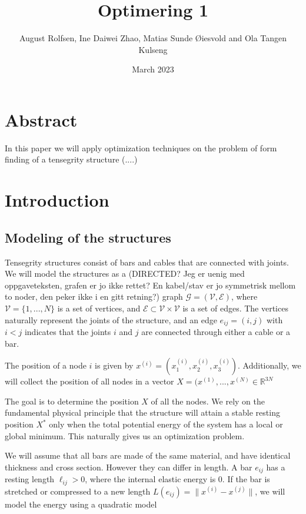 \documentclass[11pt]{article}
\title{\vspace{-2em} Optimering 1\vspace{-1em}}
\author{August Rolfsen, Ine Daiwei Zhao, Matias Sunde Øiesvold and Ola Tangen Kulseng}
\date{\vspace{-1em}March 2023\vspace{-2em}}
\begin{document}
\maketitle
\section{Abstract}

In this paper we will apply optimization techniques on the problem of form finding of a tensegrity structure (....)

\section{Introduction}
\subsection{Modeling of the structures}
Tensegrity structures consist of bars and cables that are connected with joints. We will model the structures as a (DIRECTED? Jeg er uenig med oppgaveteksten, grafen er jo ikke rettet? En kabel/stav er jo symmetrisk mellom to noder, den peker ikke i en gitt retning?) graph $\mathcal{G} = (\mathcal{V},\mathcal{E})$, where $\mathcal{V} = \{1,...,N\}$ is a set of vertices, and $\mathcal{E} \subset \mathcal{V} \times \mathcal{V}$ is a set of edges. The vertices naturally represent the joints of the structure, and an edge $e_{ij} = (i,j)$ with $i < j$ indicates that the joints $i$ and $j$ are connected through either a cable or a bar.

The position of a node $i$ is given by $x^{(i)} = (x_1^{(i)},x_2^{(i)},x_3^{(i)})$. Additionally, we will collect the position of all nodes in a vector $X = (x^{(1)},...,x^{(N)} \in \mathbb{R}^{3N}$

The goal is to determine the position $X$ of all the nodes. We rely on the fundamental physical principle that the structure will attain a stable resting position $X^*$ only when the total potential energy of the system has a local or global minimum. This naturally gives us an optimization problem.

We will assume that all bars are made of the same material, and have identical thickness and cross section. However they can differ in length. A bar $e_{ij}$ has a resting length $\ell_{ij}>0$, where the internal elastic energy is $0$. If the bar is stretched or compressed to a new length $L(e_{ij})=\lVert x^{(i)} - x^{(j)}\rVert$, we will model the energy using a quadratic model 
\end{document}
